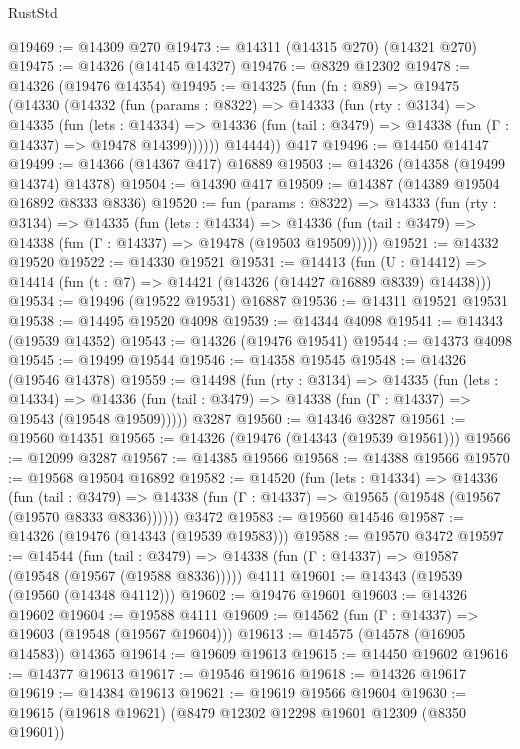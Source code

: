\begin{lexlean}{RustStd}
\begin{coremodule}
@19469 := @14309 @270
@19473 := @14311 (@14315 @270) (@14321 @270)
@19475 := @14326 (@14145 @14327)
@19476 := @8329 @12302
@19478 := @14326 (@19476 @14354)
@19495 := @14325
    (fun (fn : @89) =>
    @19475
      (@14330
        (@14332
          (fun (params : @8322) =>
          @14333
            (fun (rty : @3134) =>
            @14335
              (fun (lets : @14334) =>
              @14336 (fun (tail : @3479) => @14338 (fun (Γ : @14337) => @19478 @14399))))))
        @14444))
    @417
@19496 := @14450 @14147
@19499 := @14366 (@14367 @417) @16889
@19503 := @14326 (@14358 (@19499 @14374) @14378)
@19504 := @14390 @417
@19509 := @14387 (@14389 @19504 @16892 @8333 @8336)
@19520 := fun (params : @8322) =>
  @14333
    (fun (rty : @3134) =>
    @14335
      (fun (lets : @14334) =>
      @14336 (fun (tail : @3479) => @14338 (fun (Γ : @14337) => @19478 (@19503 @19509)))))
@19521 := @14332 @19520
@19522 := @14330 @19521
@19531 := @14413
    (fun (U : @14412) => @14414 (fun (t : @7) => @14421 (@14326 (@14427 @16889 @8339) @14438)))
@19534 := @19496 (@19522 @19531) @16887
@19536 := @14311 @19521 @19531
@19538 := @14495 @19520 @4098
@19539 := @14344 @4098
@19541 := @14343 (@19539 @14352)
@19543 := @14326 (@19476 @19541)
@19544 := @14373 @4098
@19545 := @19499 @19544
@19546 := @14358 @19545
@19548 := @14326 (@19546 @14378)
@19559 := @14498
    (fun (rty : @3134) =>
    @14335
      (fun (lets : @14334) =>
      @14336 (fun (tail : @3479) => @14338 (fun (Γ : @14337) => @19543 (@19548 @19509)))))
    @3287
@19560 := @14346 @3287
@19561 := @19560 @14351
@19565 := @14326 (@19476 (@14343 (@19539 @19561)))
@19566 := @12099 @3287
@19567 := @14385 @19566
@19568 := @14388 @19566
@19570 := @19568 @19504 @16892
@19582 := @14520
    (fun (lets : @14334) =>
    @14336
      (fun (tail : @3479) =>
      @14338 (fun (Γ : @14337) => @19565 (@19548 (@19567 (@19570 @8333 @8336))))))
    @3472
@19583 := @19560 @14546
@19587 := @14326 (@19476 (@14343 (@19539 @19583)))
@19588 := @19570 @3472
@19597 := @14544
    (fun (tail : @3479) => @14338 (fun (Γ : @14337) => @19587 (@19548 (@19567 (@19588 @8336)))))
    @4111
@19601 := @14343 (@19539 (@19560 (@14348 @4112)))
@19602 := @19476 @19601
@19603 := @14326 @19602
@19604 := @19588 @4111
@19609 := @14562 (fun (Γ : @14337) => @19603 (@19548 (@19567 @19604)))
@19613 := @14575 (@14578 (@16905 @14583)) @14365
@19614 := @19609 @19613
@19615 := @14450 @19602
@19616 := @14377 @19613
@19617 := @19546 @19616
@19618 := @14326 @19617
@19619 := @14384 @19613
@19621 := @19619 @19566 @19604
@19630 := @19615 (@19618 @19621) (@8479 @12302 @12298 @19601 @12309 (@8350 @19601))

\end{coremodule}
\end{lexlean}
